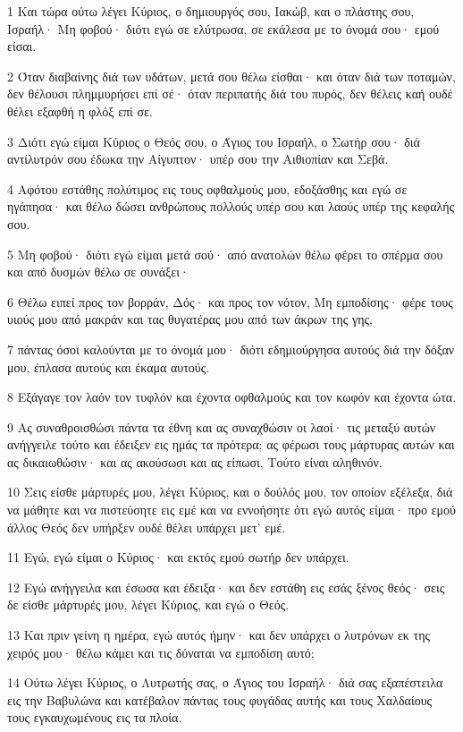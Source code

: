 \par 1 Και τώρα ούτω λέγει Κύριος, ο δημιουργός σου, Ιακώβ, και ο πλάστης σου, Ισραήλ· Μη φοβού· διότι εγώ σε ελύτρωσα, σε εκάλεσα με το όνομά σου· εμού είσαι.
\par 2 Όταν διαβαίνης διά των υδάτων, μετά σου θέλω είσθαι· και όταν διά των ποταμών, δεν θέλουσι πλημμυρήσει επί σέ· όταν περιπατής διά του πυρός, δεν θέλεις καή ουδέ θέλει εξαφθή η φλόξ επί σε.
\par 3 Διότι εγώ είμαι Κύριος ο Θεός σου, ο Άγιος του Ισραήλ, ο Σωτήρ σου· διά αντίλυτρόν σου έδωκα την Αίγυπτον· υπέρ σου την Αιθιοπίαν και Σεβά.
\par 4 Αφότου εστάθης πολύτιμος εις τους οφθαλμούς μου, εδοξάσθης και εγώ σε ηγάπησα· και θέλω δώσει ανθρώπους πολλούς υπέρ σου και λαούς υπέρ της κεφαλής σου.
\par 5 Μη φοβού· διότι εγώ είμαι μετά σού· από ανατολών θέλω φέρει το σπέρμα σου και από δυσμών θέλω σε συνάξει·
\par 6 Θέλω ειπεί προς τον βορράν, Δός· και προς τον νότον, Μη εμποδίσης· φέρε τους υιούς μου από μακράν και τας θυγατέρας μου από των άκρων της γης,
\par 7 πάντας όσοι καλούνται με το όνομά μου· διότι εδημιούργησα αυτούς διά την δόξαν μου, έπλασα αυτούς και έκαμα αυτούς.
\par 8 Εξάγαγε τον λαόν τον τυφλόν και έχοντα οφθαλμούς και τον κωφόν και έχοντα ώτα.
\par 9 Ας συναθροισθώσι πάντα τα έθνη και ας συναχθώσιν οι λαοί· τις μεταξύ αυτών ανήγγειλε τούτο και έδειξεν εις ημάς τα πρότερα; ας φέρωσι τους μάρτυρας αυτών και ας δικαιωθώσιν· και ας ακούσωσι και ας είπωσι, Τούτο είναι αληθινόν.
\par 10 Σεις είσθε μάρτυρές μου, λέγει Κύριος, και ο δούλός μου, τον οποίον εξέλεξα, διά να μάθητε και να πιστεύσητε εις εμέ και να εννοήσητε ότι εγώ αυτός είμαι· προ εμού άλλος Θεός δεν υπήρξεν ουδέ θέλει υπάρχει μετ' εμέ.
\par 11 Εγώ, εγώ είμαι ο Κύριος· και εκτός εμού σωτήρ δεν υπάρχει.
\par 12 Εγώ ανήγγειλα και έσωσα και έδειξα· και δεν εστάθη εις εσάς ξένος θεός· σεις δε είσθε μάρτυρές μου, λέγει Κύριος, και εγώ ο Θεός.
\par 13 Και πριν γείνη η ημέρα, εγώ αυτός ήμην· και δεν υπάρχει ο λυτρόνων εκ της χειρός μου· θέλω κάμει και τις δύναται να εμποδίση αυτό;
\par 14 Ούτω λέγει Κύριος, ο Λυτρωτής σας, ο Άγιος του Ισραήλ· διά σας εξαπέστειλα εις την Βαβυλώνα και κατέβαλον πάντας τους φυγάδας αυτής και τους Χαλδαίους τους εγκαυχωμένους εις τα πλοία.
